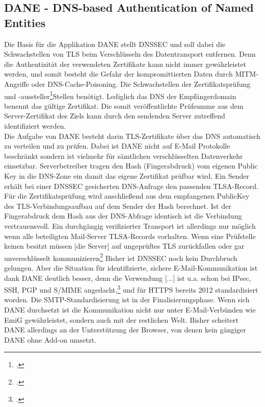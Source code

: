 \documentclass  [paper=a4,
				fontsize=12pt,
				listof=totoc,
				bibliography=totoc
				]{scrreprt}
\begin{document}
		\subsection{DANE - DNS-based Authentication of Named Entities}
		\label{subsec:dane}                                             
			Die Basis für die Applikation \ac{DANE} stellt \ac{DNSSEC} und soll dabei die Schwachstellen von \ac{TLS} beim Verschlüsseln des Datentransport entfernen. Denn die Authentizität der verwendeten Zertifikate kann nicht immer gewährleistet werden, und somit besteht die Gefahr der kompromittierten Daten durch \ac{MITM}-Angriffe oder \ac{DNS}-Cache-Poisoning.
			Die Schwachstellen der Zertifikatsprüfung und -aussteller\footcite{Koetter2014}Stellen benötigt. Lediglich das DNS der Empfängerdomain benennt das gültige Zertifikat. Die somit  veröffentlichte Prüfsumme aus dem Server-Zertifikat des Ziels kann durch den sendenden Server zutreffend identifiziert werden.\medskip\\
			Die Aufgabe von \ac{DANE} besteht darin \ac{TLS}-Zertifikate über das \ac{DNS} automatisch zu verteilen und zu prüfen. Dabei ist \ac{DANE} nicht auf E-Mail Protokolle beschränkt sondern ist vielmehr für sämtlichen verschlüsselten Datenverkehr einsetzbar.
			Serverbetreiber tragen den Hash (Fingerabdruck) vom eigenen Public Key in die \ac{DNS}-Zone ein damit das eigene Zertifikat prüfbar wird. Ein Sender erhält bei einer \ac{DNSSEC} gesicherten \ac{DNS}-Anfrage den passenden \ac{TLSA}-Record. Für die Zertifikatsprüfung wird anschließend aus dem empfangenen PublicKey des \ac{TLS}-Verbindungsaufbau auf dem Sender der Hash berechnet. Ist der Fingerabdruck dem Hash aus der \ac{DNS}-Abfrage identisch ist die Verbindung vertrauensvoll.
			Ein durchgängig verifizierter Transport ist allerdings nur möglich wenn alle beteiligten Mail-Server \ac{TLSA}-Records vorhalten. Wenn eine Prüfstelle keinen besitzt \glqq müssen [die Server] auf ungeprüftes \ac{TLS} zurückfallen oder gar unverschlüsselt kommunizieren\grqq\footcite[][S. 197]{Koetter2014}
			Bisher ist \ac{DNSSEC} noch kein Durchbruch gelungen. Aber die Situation für identifizierte, sichere E-Mail-Kommunikation ist dank \ac{DANE} deutlich besser, denn \glqq die Verwendung [...] ist u.a. schon bei \ac{IPsec}, \ac{SSH}, \ac{PGP} und \ac{S/MIME} angedacht,\grqq\footcite[][S. 196]{Koetter2014} und für \ac{HTTPS} bereits 2012 standardisiert worden. Die \ac{SMTP}-Standardisierung ist in der Finalisierungsphase. Wenn sich \ac{DANE} durchsetzt ist die Kommunikation nicht nur unter E-Mail-Verbünden wie \ac{EmiG} gewährleistet, sondern auch mit der restlichen Welt. Bisher scheitert \ac{DANE} allerdings an der Unterstützung der Browser, von denen kein gängiger \ac{DANE} ohne Add-on umsetzt.
	\pagebreak
\end{document}
